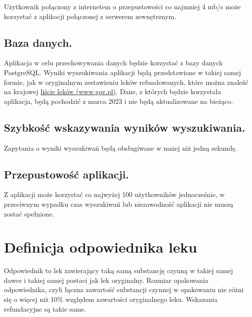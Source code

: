 \documentclass[12pt]{article}
\begin{document}
Użytkownik połączony z internetem o przepustowości co najmniej 4 mb/s może korzystać z aplikacji połączonej z serwerem zewnętrznym.

\subsection{Baza danych.}

 Aplikacja w celu przechowywania danych będzie korzystać z bazy danych PostgreSQL.
 Wyniki wyszukiwania aplikacji będą przedstawione w takiej samej formie, jak
 w oryginalnym zestawieniu leków refundowanych, które można znaleźć na krajowej
 \href{https://www.gov.pl/attachment/e1c2cf1e-8fed-468a-9f1f-e6d49f5b137f}{liście
 leków (www.gov.pl)}. Dane, z których będzie korzystała aplikacja, będą
 pochodzić z marca 2023 i nie będą aktualizowane na bieżąco.

\subsection{Szybkość wskazywania wyników wyszukiwania.}
 
Zapytania o wyniki wyszukiwań będą obsługiwane w mniej niż jedną sekundę.

\subsection{Przepustowość aplikacji.}

Z aplikacji może korzystać co najwyżej 100 użytkowników jednocześnie, w przeciwnym wypadku czas wyszukiwań lub niezawodność aplikacji nie muszą zostać spełnione.

\section{Definicja odpowiednika leku}

Odpowiednik to lek zawierający taką samą substancję czynną w takiej samej dawce
i takiej samej postaci jak lek oryginalny. Rozmiar opakowania odpowiednika,
czyli łączna zawartość substancji czynnej w opakowaniu nie różni się o więcej
niż 10\% względem zawartości oryginalnego leku. Wskazania refundacyjne są takie
same.
\end{document}
